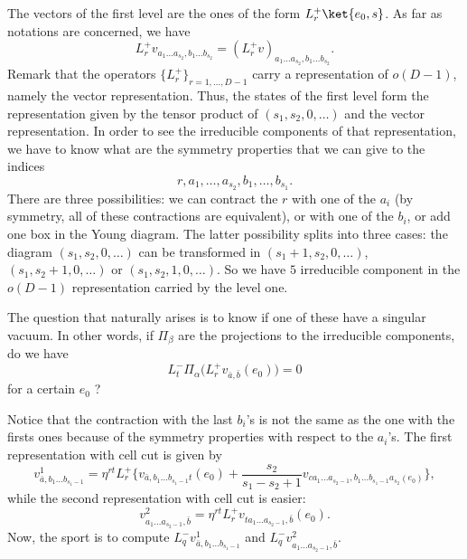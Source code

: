 The vectors of the first level are the ones of the form	$L^+_r\ket{e_0,s}$. As far as notations are concerned, we have
\begin{equation}
	L^+_rv_{a_1\ldots a_{s_2},b_1\ldots b_{s_2}}=(L^+_rv)_{a_1\ldots a_{s_2},b_1\ldots b_{s_2}}.
\end{equation}
Remark that the operators $\{ L_r^+ \}_{r=1,\ldots,D-1}$ carry a representation of $o(D-1)$, namely the vector representation. Thus, the states of the first level form the representation given by the tensor product of $(s_1,s_2,0,\ldots)$ and the vector representation. In order to see the irreducible components of that representation, we have to know what are the symmetry properties that we can give to the indices
\begin{equation}
	r,a_1,\ldots,a_{s_2},b_1,\ldots,b_{s_1}.
\end{equation}
There are three possibilities: we can contract the $r$ with one of the $a_i$ (by symmetry, all of these contractions are equivalent), or with one of the $b_i$, or add one box in the Young diagram. The latter possibility splits into three cases: the diagram $(s_1,s_2,0,\ldots)$ can be transformed in $(s_1+1,s_2,0,\ldots)$, $(s_1,s_2+1,0,\ldots)$ or $(s_1,s_2,1,0,\ldots)$. So we have $5$ irreducible component in the $o(D-1)$ representation carried by the level one.

The question that naturally arises is to know if one of these have a singular vacuum. In other words, if $\Pi_{\beta}$ are the projections to the irreducible components, do we have
\begin{equation}
	L^-_{t}\Pi_{\alpha}\big( L^+_rv_{\bar a,\bar b}(e_0) \big)=0
\end{equation}
for a certain $e_0$ ?

Notice that the contraction with the last $b_i$'s is not the same as the one with the firsts ones because of the symmetry properties with respect to the $a_i$'s. The first representation with cell cut is given by
\begin{equation}
	v^1_{\bar a,b_1\ldots b_{s_1-1}}	=\eta^{rt}L^+_r\big\{ v_{\bar a,b_1 \ldots b_{s_1-1}t}(e_0)
							+\frac{ s_2 }{ s_1-s_2+1 } v_{ca_1\ldots a_{s_2-1},b_1\ldots b_{s_1-1}a_{s_2}(e_0)}\big\},
\end{equation}
while the second representation with cell cut is easier:
\begin{equation}
	v^2_{a_1\ldots a_{s_{2}-1},\bar b}=\eta^{rt}L^+_rv_{ta_1\ldots a_{s_2-1},\bar b}(e_0).
\end{equation}
Now, the sport is to compute $L^-_qv^1_{\bar a,b_1\ldots b_{s_1-1}}$ and $L^-_q v^2_{a_1\ldots a_{s_{2}-1},\bar b}$.

